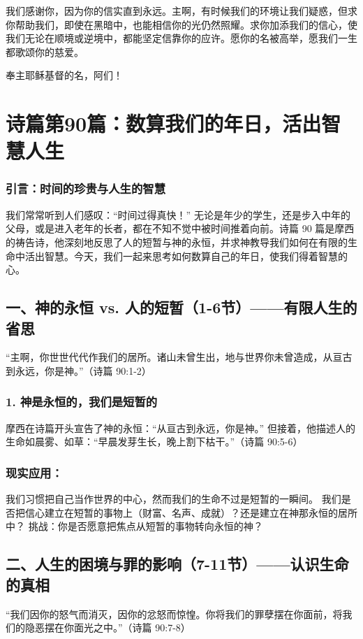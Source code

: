 \documentclass[a4paper, 12pt]{article}
\begin{document}
我们感谢你，因为你的信实直到永远。主啊，有时候我们的环境让我们疑惑，但求你帮助我们，即使在黑暗中，也能相信你的光仍然照耀。求你加添我们的信心，使我们无论在顺境或逆境中，都能坚定信靠你的应许。愿你的名被高举，愿我们一生都歌颂你的慈爱。

奉主耶稣基督的名，阿们！
\newpage
\section{诗篇第90篇：数算我们的年日，活出智慧人生}
\subsubsection*{引言：时间的珍贵与人生的智慧}
我们常常听到人们感叹：“时间过得真快！” 无论是年少的学生，还是步入中年的父母，或是进入老年的长者，都在不知不觉中被时间推着向前。诗篇 90 篇是摩西的祷告诗，他深刻地反思了人的短暂与神的永恒，并求神教导我们如何在有限的生命中活出智慧。今天，我们一起来思考如何数算自己的年日，使我们得着智慧的心。

\subsection*{一、神的永恒 vs. 人的短暂（1-6节）——有限人生的省思}
“主啊，你世世代代作我们的居所。诸山未曾生出，地与世界你未曾造成，从亘古到永远，你是神。”（诗篇 90:1-2）

\subsubsection*{1. 神是永恒的，我们是短暂的}
摩西在诗篇开头宣告了神的永恒：“从亘古到永远，你是神。”
但接着，他描述人的生命如晨雾、如草：“早晨发芽生长，晚上割下枯干。”（诗篇 90:5-6）
\subsubsection*{现实应用：}

我们习惯把自己当作世界的中心，然而我们的生命不过是短暂的一瞬间。
我们是否把信心建立在短暂的事物上（财富、名声、成就）？还是建立在神那永恒的居所中？
挑战：你是否愿意把焦点从短暂的事物转向永恒的神？

\subsection*{二、人生的困境与罪的影响（7-11节）——认识生命的真相}
“我们因你的怒气而消灭，因你的忿怒而惊惶。你将我们的罪孽摆在你面前，将我们的隐恶摆在你面光之中。”（诗篇 90:7-8）
\end{document}

